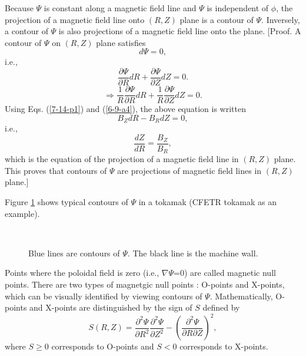 \documentclass{llncs}
\begin{document}
Because $\Psi$ is constant along a magnetic field line and $\Psi$ is
independent of $\phi$, the projection of a magnetic field line onto $(R, Z)$
plane is a contour of $\Psi$. Inversely, a contour of $\Psi$ is also
projections of a magnetic field line onto the plane. [Proof. A contour of
$\Psi$ on $(R, Z)$ plane satisfies
\begin{equation}
  d \Psi = 0,
\end{equation}
i.e.,
\begin{equation}
  \frac{\partial \Psi}{\partial R} d R + \frac{\partial \Psi}{\partial Z} d Z
  = 0.
\end{equation}
\begin{equation}
  \Rightarrow \frac{1}{R}  \frac{\partial \Psi}{\partial R} d R + \frac{1}{R} 
  \frac{\partial \Psi}{\partial Z} d Z = 0.
\end{equation}
Using Eqs. (\ref{7-14-p1}) and (\ref{6-9-a4}), the above equation is written
\begin{equation}
  B_Z d R - B_R d Z = 0,
\end{equation}
i.e.,
\begin{equation}
  \label{8-22-1} \frac{d Z}{d R} = \frac{B_Z}{B_R},
\end{equation}
which is the equation of the projection of a magnetic field line in $(R, Z)$
plane. This proves that contours of $\Psi$ are projections of magnetic field
lines in $(R, Z)$ plane.]

Figure \ref{24-11-15-1} shows typical contours of $\Psi$ in a tokamak (CFETR
tokamak as an example).

\begin{figure}[h]
  
  \
  \caption{\label{24-11-15-1}Blue lines are contours of $\Psi$. The black
  line is the machine wall. }
\end{figure}

Points where the poloidal field is zero (i.e., $\nabla \Psi$=0) are called
magnetic null points. There are two types of magnetgic null points : O-points
and X-points, which can be visually identified by viewing contours of $\Psi$.
Mathematically, O-points and X-points are distinguished by the sign of $S$
defined by
\begin{equation}
  S (R, Z) = \frac{\partial^2 \Psi}{\partial R^2} \frac{\partial^2
  \Psi}{\partial Z^2} - \left( \frac{\partial^2 \Psi}{\partial R \partial Z}
  \right)^2,
\end{equation}
where $S \geqslant 0$ corresponds to O-points and $S < 0$ corresponds to
X-points.
\end{document}

